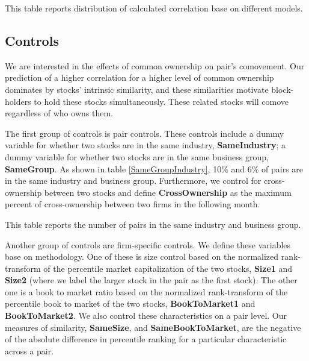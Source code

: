 	
{	\begin{table}[htbp]
		\centering
		\caption{\footnotesize This table reports distribution of calculated correlation base on different models.}
		\label{tCorr}
		\resizebox{0.7\textwidth}{!}
		{
			
		}
	\end{table}}



\FloatBarrier


\subsection{Controls}

We are interested in the effects of common ownership on pair's comovement.
Our prediction of a higher correlation for a higher level of common ownership dominates by stocks' intrinsic similarity, and these similarities motivate block-holders to hold these stocks simultaneously. These related stocks will comove regardless of who owns them.

The first group of controls is pair controls. These controls include
a dummy variable for whether two stocks are in the same industry, \textbf{SameIndustry}; a dummy variable for whether two stocks are in the same business group, \textbf{SameGroup}. As shown in table \ref{SameGroupIndustry}, 10\% and 6\%  of pairs are in the same industry and business group. Furthermore, we control for cross-ownership between two stocks and define  \textbf{CrossOwnership} as the maximum percent of cross-ownership between two firms in the following month.


	{\begin{table}[htbp]
			\caption{\scriptsize This table reports the number of pairs in the same industry and business group.}
			\label{SameGroupIndustry}
			\centering \scriptsize
			{
				
			}
	\end{table}}


Another group of controls are firm-specific controls.  We define these variables base on  \cite{AntonPolk} methodology. One of these is size control based on the normalized rank-transform of the percentile market capitalization of the two stocks, \textbf{Size1} and \textbf{Size2} (where we label the
larger stock in the pair as the first stock). The other one is a book to market ratio based on the normalized rank-transform of the percentile book to market of the two stocks, \textbf{BookToMarket1} and \textbf{BookToMarket2}.
We also control these characteristics on a pair level. Our measures of similarity, \textbf{SameSize}, and \textbf{SameBookToMarket}, are the negative of the absolute difference in percentile ranking for a particular characteristic across a pair.


